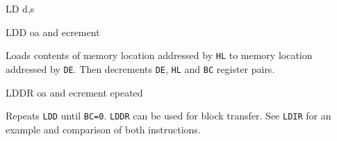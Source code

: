 \begin{basedescript}{
	\desclabelstyle{\multilinelabel}
	\desclabelwidth{3cm}}
\begin{DetailItem}{LD d,s}
		\begin{DetailTiming}
		\end{DetailTiming}

	\end{DetailItem}

	\pagebreak
	\begin{DetailItem}{LDD}
		{oa\IH{D} and ecrement}		
		{\SymLDD}

		Loads contents of memory location addressed by {\tt HL} to memory location addressed by {\tt DE}. Then decrements {\tt DE}, {\tt HL} and {\tt BC} register pairs.

		\begin{DetailEffects}
			\FlagsLDD
		\end{DetailEffects}
				
		\begin{DetailTiming}
			\DetailTime{4}{16}
		\end{DetailTiming}

	\end{DetailItem}

	\begin{DetailItem}{LDDR}
		{oa\IH{D} and ecrement epeated}		
		{\SymLDDR}

		Repeats {\tt LDD} until {\tt BC=0}. {\tt LDDR} can be used for block transfer. See {\tt LDIR} for an example and comparison of both instructions.

		\begin{DetailEffects}
			\FlagsLDDR
		\end{DetailEffects}
				
		\begin{DetailTiming}
			\DetailTimeRegular[{\tt BC}=0]{4}{16}
			\DetailTimeRegular[{\tt BC}$\neq$0]{5}{21}
		\end{DetailTiming}

	\end{DetailItem}



\end{basedescript}
